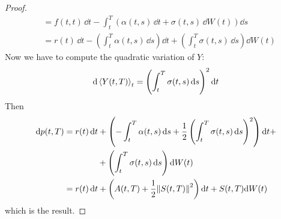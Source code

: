 \begin{proof}
\begin{align*}
        &=
        f(t,t)\,\dd t - \int_t^T (\alpha(t,s)\,\dd t + \sigma(t,s)\,\dd W(t))\dd s \\
        &=
        r(t)\,\dd t - \left(\int_t^T \alpha(t,s)\,\dd s\right)\dd t + \left(\int_t^T \sigma(t,s)\,\dd s\right)\dd W(t)
    \end{align*}
    Now we have to compute the quadratic variation of $Y$:
    \begin{align*}
        \dd\expval{Y(t,T)}_t = \left(\int_t^T \sigma(t,s)\,\dd s\right)^2\dd t
    \end{align*}
    Then
    \begin{align*}
        \dd p(t,T) &= r(t)\,\dd t + \left(- \int_t^T \alpha(t,s)\,\dd s + \frac{1}{2}\left(\int_t^T \sigma(t,s)\,\dd s\right)^2\right)\dd t + \\
        &\qquad\qquad
        + \left(\int_t^T \sigma(t,s)\,\dd s\right)\dd W(t) \\
        &=
        r(t)\,\dd t + \left(A(t,T) + \frac{1}{2}\norm{S(t,T)}^2\right)\dd t + S(t,T)\dd W(t)
    \end{align*}
    which is the result.
\end{proof}

